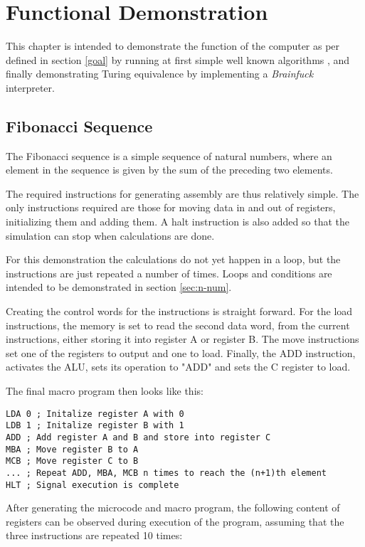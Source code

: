 \chapter{Functional Demonstration} \label{chap:demo}
This chapter is intended to demonstrate the function of the computer as per defined in section \ref{goal} by running at first simple well known algorithms \cite{chatgptalgoidea}, and finally demonstrating Turing equivalence by implementing a \textit{Brainfuck} interpreter. %

\section{Fibonacci Sequence}
The Fibonacci sequence is a simple sequence of natural numbers, where an element in the sequence is given by the sum of the preceding two elements.

The required instructions for generating assembly are thus relatively simple. The only instructions required are those for moving data in and out of registers, initializing them and adding them. A halt instruction is also added so that the simulation can stop when calculations are done. 

For this demonstration the calculations do not yet happen in a loop, but the instructions are just repeated a number of times. Loops and conditions are intended to be demonstrated in section \ref{sec:n-num}.

Creating the control words for the instructions is straight forward. For the load instructions, the memory is set to read the second data word, from the current instructions, either storing it into register A or register B. The move instructions set one of the registers to output and one to load. Finally, the ADD instruction, activates the ALU, sets its operation to "ADD" and sets the C register to load. 

The final macro program then looks like this: 
\begin{lstlisting}[language={[x86masm]Assembler}, caption=Assembly code to calculate the fibonacci series, label=lst:fib]
LDA 0 ; Initalize register A with 0
LDB 1 ; Initalize register B with 1
ADD ; Add register A and B and store into register C
MBA ; Move register B to A
MCB ; Move register C to B
... ; Repeat ADD, MBA, MCB n times to reach the (n+1)th element
HLT ; Signal execution is complete
\end{lstlisting}

After generating the microcode and macro program, the following content of registers can be observed during execution of the program, assuming that the three instructions are repeated 10 times:

